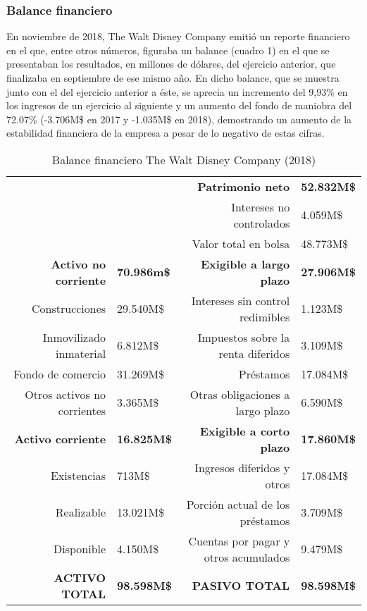 \subsubsection{Balance financiero}

En noviembre de 2018, The Walt Disney Company emitió un reporte financiero en el que, entre otros números, figuraba un balance (cuadro 1) en el que se presentaban los resultados, en millones de dólares, del ejercicio anterior, que finalizaba en septiembre de ese mismo año. En dicho balance, que se muestra junto con el del ejercicio anterior a éste, se aprecia un incremento del 9,93\% en los ingresos de un ejercicio al siguiente y un aumento del fondo de maniobra del 72.07\% (-3.706M\$ en 2017 y -1.035M\$ en 2018), demostrando un aumento de la estabilidad financiera de la empresa a pesar de lo negativo de estas cifras.

\begin{table}[]
\centering
\begin{tabular}{rlrl}
 & & \textbf{Patrimonio neto} & \textbf{52.832M\$} \\
 & & Intereses no controlados & 4.059M\$ \\
 & & Valor total en bolsa & 48.773M\$ \\
\textbf{Activo no corriente} & \textbf{70.986m\$}& \textbf{Exigible a largo plazo} & \textbf{27.906M\$} \\
Construcciones & 29.540M\$ & Intereses sin control redimibles & 1.123M\$ \\
Inmovilizado inmaterial & 6.812M\$ & Impuestos sobre la renta diferidos & 3.109M\$ \\
Fondo de comercio & 31.269M\$ & Préstamos & 17.084M\$ \\
Otros activos no corrientes & 3.365M\$ & Otras obligaciones a largo plazo & 6.590M\$ \\
\textbf{Activo corriente} & \textbf{16.825M\$} & \textbf{Exigible a corto plazo} & \textbf{17.860M\$} \\
Existencias & 713M\$ & Ingresos diferidos y otros & 17.084M\$ \\
Realizable & 13.021M\$ & Porción actual de los préstamos & 3.709M\$ \\
Disponible & 4.150M\$ & Cuentas por pagar y otros acumulados & 9.479M\$ \\
\textbf{ACTIVO TOTAL} & \textbf{98.598M\$} & \textbf{PASIVO TOTAL} & \textbf{98.598M\$}
\end{tabular}
\caption{\label{fig:frog}Balance financiero The Walt Disney Company (2018)}
\end{table}